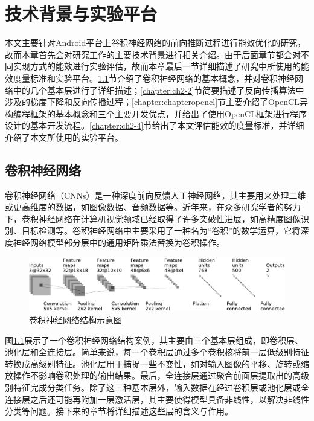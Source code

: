 \chapter{技术背景与实验平台}
\label{chapter:chapter2}
本文主要针对Android平台上卷积神经网络的前向推断过程进行能效优化的研究，故而本章首先会对研究工作的主要技术背景进行相关介绍。由于后面章节都会对不同实现方式的能效进行实验评估，故而本章最后一节详细描述了研究中所使用的能效度量标准和实验平台。\ref{chapter:ch2-1}节介绍了卷积神经网络的基本概念，并对卷积神经网络中的几个基本层进行了详细描述；\ref{chapter:ch2-2}节简要描述了反向传播算法中涉及的梯度下降\cite{bottou2010large}和反向传播过程；\ref{chapter:chapteropencl}节主要介绍了OpenCL异构编程框架的基本概念和三个主要开发优点，并给出了使用OpenCL框架进行程序设计的基本开发流程。\ref{chapter:ch2-4}节给出了本文评估能效的度量标准，并详细介绍了本文所使用的实验平台。

\section{卷积神经网络}
\label{chapter:ch2-1}
卷积神经网络（CNNs）是一种深度前向反馈人工神经网络\cite{schalkoff1997artificial}，其主要用来处理二维或更高维度的数据，如图像数据、音频数据等。近年来，在众多研究学者的努力下，卷积神经网络在计算机视觉领域已经取得了许多突破性进展，如高精度图像识别、目标检测等。卷积神经网络中主要采用了一种名为“卷积”的数学运算，它将深度神经网络模型部分层中的通用矩阵乘法替换为卷积操作。

\begin{figure}[htbp]
    \includegraphics[width=1\textwidth]{figures/convnet_fig_cropped.pdf}
    \caption{卷积神经网络结构示意图 \cite{github.com}}\label{figure:figure1}
\end{figure}

图\ref{figure:figure1}展示了一个卷积神经网络结构案例，其主要由三个基本层组成，即卷积层、池化层和全连接层。简单来说，每一个卷积层通过多个卷积核将前一层低级别特征转换成高级别特征。池化层用于捕捉一些不变性，如对输入图像的平移、旋转或缩放操作不影响卷积处理的输出结果。最后，全连接层通过聚合前面层提取出的高级别特征完成分类任务。除了这三种基本层外，输入数据在经过卷积层或池化层或全连接层之后还可能再附加一层激活层，其主要使得模型具备非线性，以解决非线性分类等问题。接下来的章节将详细描述这些层的含义与作用。

